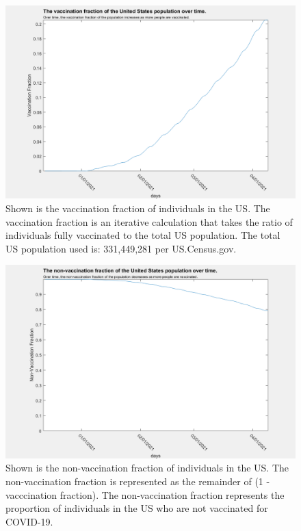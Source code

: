 \documentclass[twoside]{article}
\begin{document}
\begin{multicols}{2}
\begin{figure}[H]
	\includegraphics[width=\linewidth]{images/vac_fraction_US.png}
	\caption{Shown is the vaccination fraction of individuals in the US. The vaccination fraction is an iterative calculation that takes the ratio of individuals fully vaccinated to the total US population. The total US population used is: 331,449,281 per US.Census.gov.  }
	\label{fig:images/vac_fraction_USLabel}
\end{figure}

\begin{figure}[H]
	\includegraphics[width=\linewidth]{images/non_vac_fraction_US.png}
	\caption{Shown is the non-vaccination fraction of individuals in the US. The non-vaccination fraction is represented as the remainder of (1 - vacccination fraction). The non-vaccination fraction represents the proportion of individuals in the US who are not vaccinated for COVID-19. }
	\label{fig:images/non_vac_fraction_USLabel}
\end{figure}


\end{multicols}
\end{document}
